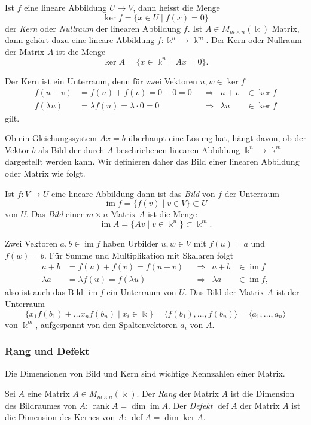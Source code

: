 \begin{definition}
%
Ist $f$ eine lineare Abbildung $U\to V$, dann heisst die Menge
\[
\ker f
=
\{x\in U \mid f(x)=0\}
\]
der {\em Kern} oder {\em Nullraum} der linearen Abbildung $f$.
%
%
Ist $A \in M_{m\times n}(\Bbbk)$ Matrix, dann gehört dazu eine lineare
Abbildung $f\colon\Bbbk^n\to\Bbbk^m$.
Der Kern oder Nullraum der Matrix $A$ ist die Menge
\[
\ker A
=
\{ x\in\Bbbk^n \mid Ax=0\}.
\]
\end{definition}

Der Kern ist ein Unterraum, denn für zwei Vektoren $u,w\in \ker f$
\[
\begin{aligned}
f(u+v)&=f(u) + f(v) = 0+0 = 0 &&\Rightarrow& u+v&\in\ker f\\
f(\lambda u)&=\lambda f(u) = \lambda\cdot 0=0&&\Rightarrow& \lambda u&\in\ker f
\end{aligned}
\]
gilt.

Ob ein Gleichungssystem $Ax=b$ überhaupt eine Lösung hat, hängt davon,
ob der Vektor $b$ als Bild der durch $A$ beschriebenen linearen Abbildung
$\Bbbk^n \to \Bbbk^m$ dargestellt werden kann.
Wir definieren daher das Bild einer linearen Abbildung oder Matrix
wie folgt.

\begin{definition}
Ist $f\colon V\to U$ eine lineare Abbildung dann ist das {\em Bild} von $f$
der Unterraum
\[
\operatorname{im}f = \{ f(v)  \mid v\in V\} \subset U
\]
von $U$.
Das {\em Bild} einer $m\times n$-Matrix $A$ ist die Menge
\[
\operatorname{im}A = \{ Av \mid v\in\Bbbk^n\} \subset \Bbbk^m.
\]
\end{definition}
%

Zwei Vektoren $a,b\in\operatorname{im} f$ haben Urbilder $u,w\in V$ mit
$f(u)=a$ und $f(w)=b$.
Für Summe und Multiplikation mit Skalaren folgt
\[
\begin{aligned}
a+b       &= f(u)+f(v)=f(u+v)           && \Rightarrow &       a+b &\in\operatorname{im}f\phantom{,}\\
\lambda a &=\lambda f(u) = f(\lambda u) && \Rightarrow & \lambda a &\in\operatorname{im}f,
\end{aligned}
\]
also ist auch das Bild $\operatorname{im}f$ ein Unterraum von $U$.
Das Bild der Matrix $A$ ist der Unterraum
\[
\{ x_1f(b_1) + \dots x_n f(b_n) \mid x_i\in\Bbbk\}
=
\langle f(b_1),\dots,f(b_n)\rangle
=
\langle a_1,\dots,a_n\rangle
\]
von $\Bbbk^m$, aufgespannt von den Spaltenvektoren $a_i$ von $A$.

\subsubsection{Rang und Defekt}
Die Dimensionen von Bild und Kern sind wichtige Kennzahlen einer Matrix.
\begin{definition}
Sei $A$ eine Matrix $A\in M_{m\times n}(\Bbbk)$.
Der {\em Rang} der Matrix $A$ ist die Dimension des Bildraumes von $A$:
$\operatorname{rank}A=\dim\operatorname{im} A$.
%
%
Der {\em Defekt} $\operatorname{def}A$ der Matrix $A$ ist die Dimension
des Kernes von $A$:
$\operatorname{def}A=\dim\ker A$.
%
\end{definition}

